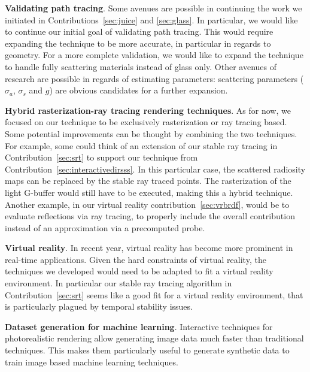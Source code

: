 \textbf{Validating path tracing}. Some avenues are possible in continuing the work we initiated in Contributions~\ref{sec:juice} and \ref{sec:glass}. In particular, we would like to continue our initial goal of validating path tracing. This would require expanding the technique to be more accurate, in particular in regards to geometry. For a more complete validation, we would like to expand the technique to handle fully scattering materials instead of glass only. Other avenues of research are possible in regards of estimating parameters: scattering parameters ($\sigma_a$, $\sigma_s$ and $g$) are obvious candidates for a further expansion.

\textbf{Hybrid rasterization-ray tracing rendering techniques}. As for now, we focused on our technique to be exclusively rasterization or ray tracing based. Some potential improvements can be thought by combining the two techniques. For example, some could think of an extension of our stable ray tracing in Contribution~\ref{sec:srt} to support our technique from Contribution~\ref{sec:interactivedirsss}. In this particular case, the scattered radiosity maps can be replaced by the stable ray traced points. The rasterization of the light G-buffer would still have to be executed, making this a hybrid technique.  Another example, in our virtual reality contribution~\ref{sec:vrbrdf}, would be to evaluate reflections via ray tracing, to properly include the overall contribution instead of an approximation via a precomputed probe.

\textbf{Virtual reality}. In recent year, virtual reality has become more prominent in real-time applications. Given the hard constraints of virtual reality, the techniques we developed would need to be adapted to fit a virtual reality environment. In particular our stable ray tracing algorithm in Contribution~\ref{sec:srt} seems like a good fit for a virtual reality environment, that is particularly plagued by temporal stability issues. 

\textbf{Dataset generation for machine learning}. Interactive techniques for photorealistic rendering allow generating image data much faster than traditional techniques. This makes them particularly useful to generate synthetic data to train image based machine learning techniques.  